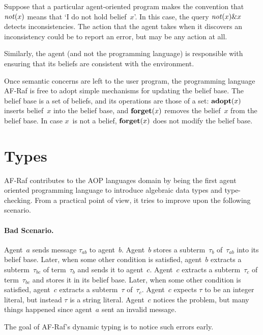 \documentclass[a4paper,12pt,oneside,fleqn]{book} %
\newcommand{\rg}[1]{\marginpar{\tiny\raggedright\textcolor{blue}{\bf rg:} #1}}
\begin{document}
\begin{example} Suppose that a particular agent-oriented program makes the
convention that ${\it not}(x)$ means that `I do not hold belief~$x$'.  In
this case, the query ${\it not}(x)\&x$ detects inconsistencies.  The action
that the agent takes when it discovers an inconsistency could be to report
an error, but may be any action at all.  \end{example}

Similarly, the agent (and not the programming language) is responsible with
ensuring that its beliefs are consistent with the environment.

Once semantic concerns are left to the user program, the programming
language AF-Raf is free to adopt simple mechanisms for updating the belief
base.  The belief base is a set of beliefs, and its operations are those of
a set:  ${\bf adopt}(x)$ inserts belief~$x$ into the belief base, and ${\bf
forget}(x)$ removes the belief~$x$ from the belief base.  In case $x$~is
not a belief, ${\bf forget}(x)$ does not modify the belief base.

\section{Types} %

AF-Raf contributes to the AOP languages domain by being the first agent
oriented programming language to introduce algebraic data types and
type-checking. From a practical point of view, it tries to improve
upon the following scenario.

\paragraph{Bad Scenario.}

Agent~$a$ sends message $\tau_{ab}$ to agent~$b$. Agent~$b$ stores a
subterm~$\tau_b$ of~$\tau_{ab}$ into its belief base. Later, when some
other condition is satisfied, agent~$b$ extracts a subterm~$\tau_{bc}$ of
term~$\tau_b$ and sends it to agent~$c$. Agent~$c$ extracts a
subterm~$\tau_c$ of term~$\tau_{bc}$ and stores it in its belief base.
Later, when some other condition is satisfied, agent~$c$ extracts a
subterm~$\tau$ of~$\tau_c$. Agent~$c$ expects $\tau$ to be an integer
literal, but instead $\tau$ is a string literal. Agent~$c$ notices the
problem, but many things happened since agent~$a$ sent an invalid message.

The goal of AF-Raf's dynamic typing is to notice such errors early.
\end{document}
